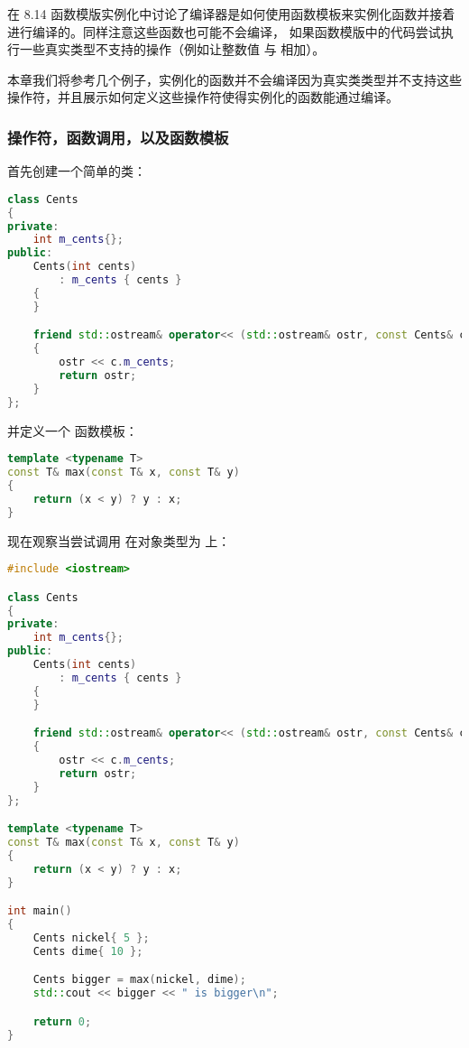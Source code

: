 \documentclass[../../LearnCpp.tex]{subfiles}
\begin{document}

在 8.14 函数模版实例化中讨论了编译器是如何使用函数模板来实例化函数并接着进行编译的。同样注意这些函数也可能不会编译，
如果函数模版中的代码尝试执行一些真实类型不支持的操作（例如让整数值  与  相加）。

本章我们将参考几个例子，实例化的函数并不会编译因为真实类类型并不支持这些操作符，并且展示如何定义这些操作符使得实例化的函数能通过编译。

\subsubsection*{操作符，函数调用，以及函数模板}

首先创建一个简单的类：

\begin{lstlisting}[language=C++]
class Cents
{
private:
    int m_cents{};
public:
    Cents(int cents)
        : m_cents { cents }
    {
    }

    friend std::ostream& operator<< (std::ostream& ostr, const Cents& c)
    {
        ostr << c.m_cents;
        return ostr;
    }
};
\end{lstlisting}

并定义一个  函数模板：

\begin{lstlisting}[language=C++]
template <typename T>
const T& max(const T& x, const T& y)
{
    return (x < y) ? y : x;
}
\end{lstlisting}

现在观察当尝试调用  在对象类型为  上：

\begin{lstlisting}[language=C++]
#include <iostream>

class Cents
{
private:
    int m_cents{};
public:
    Cents(int cents)
        : m_cents { cents }
    {
    }

    friend std::ostream& operator<< (std::ostream& ostr, const Cents& c)
    {
        ostr << c.m_cents;
        return ostr;
    }
};

template <typename T>
const T& max(const T& x, const T& y)
{
    return (x < y) ? y : x;
}

int main()
{
    Cents nickel{ 5 };
    Cents dime{ 10 };

    Cents bigger = max(nickel, dime);
    std::cout << bigger << " is bigger\n";

    return 0;
}
\end{lstlisting}
\end{document}
